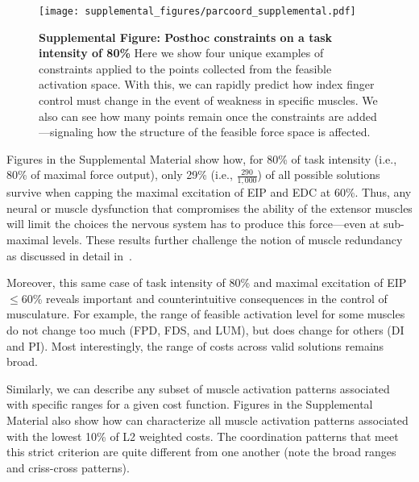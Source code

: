 \documentclass[9pt,twocolumn,twoside,lineno]{pnas-new}
\begin{document}
\begin{figure}[p]
 \centering
 \texttt{[image: supplemental\_figures/parcoord\_supplemental.pdf]}
 \caption{\textbf{Supplemental Figure: Posthoc constraints on a task intensity of 80\%} Here we show four unique examples of constraints applied to the points collected from the feasible activation space. With this, we can rapidly predict how index finger control must change in the event of weakness in specific muscles. We also can see how many points remain once the constraints are added—signaling how the structure of the feasible force space is affected.}
  \label{fig:parcoord_supplemental}
\end{figure}

Figures in the Supplemental Material show how, for 80\% of task intensity (i.e., 80\% of maximal force output), only 29\% (i.e., $\frac{290}{1,000}$) of all possible solutions survive when capping the maximal excitation of EIP and EDC at 60\%. Thus, any neural or muscle dysfunction that compromises the ability of the extensor muscles will limit the choices the nervous system has to produce this force---even at sub-maximal levels. These results further challenge the notion of muscle redundancy as discussed in detail in~\cite{kutch2011muscle,valero-cuevas2015fundamentals}.

Moreover, this same case of task intensity of 80\% and maximal excitation of EIP $\le$60\% reveals important and counterintuitive consequences in the control of musculature. For example, the range of feasible activation level for some muscles do not change too much (FPD, FDS, and LUM), but does change for others (DI and PI). Most interestingly, the range of costs across valid solutions remains broad.

Similarly, we can describe any subset of muscle activation patterns associated with specific ranges for a given cost function. Figures in the Supplemental Material also show how can characterize all muscle activation patterns associated with the lowest 10\% of L2 weighted costs. The coordination patterns that meet this strict criterion are quite different from one another (note the broad ranges and criss-cross patterns).
\end{document}

